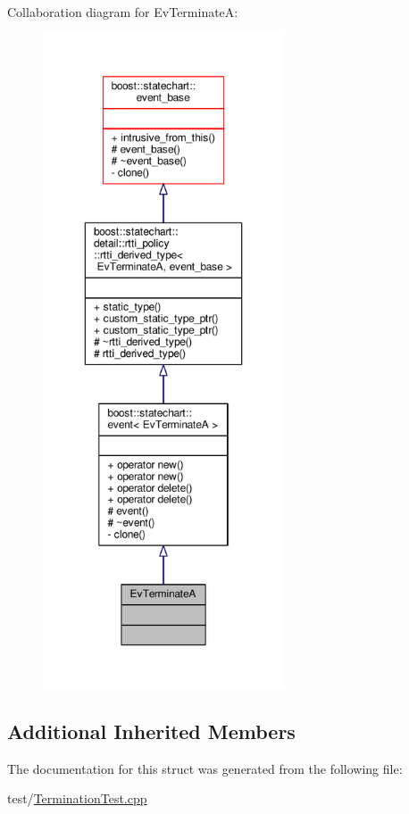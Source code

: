 Collaboration diagram for Ev\+TerminateA\+:
\nopagebreak
\begin{figure}[H]
\begin{center}
\leavevmode
\includegraphics[height=550pt]{struct_ev_terminate_a__coll__graph}
\end{center}
\end{figure}
\subsection*{Additional Inherited Members}


The documentation for this struct was generated from the following file\+:\begin{DoxyCompactItemize}
\item 
test/\mbox{\hyperlink{_termination_test_8cpp}{Termination\+Test.\+cpp}}\end{DoxyCompactItemize}
